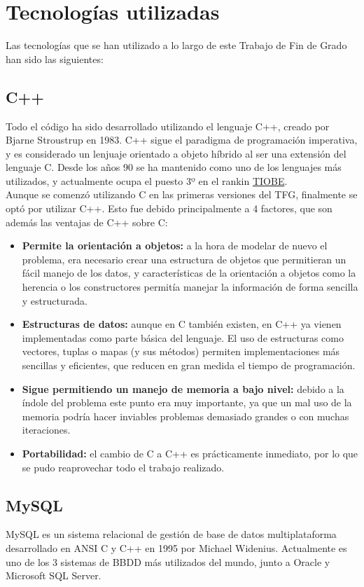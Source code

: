 \chapter{Tecnologías utilizadas}
\label{tecnologías}
Las tecnologías que se han utilizado a lo largo de este Trabajo de Fin de Grado han sido las siguientes:

\section{C++}
Todo el código ha sido desarrollado utilizando el lenguaje C++, creado por  Bjarne Stroustrup en 1983. C++ sigue el paradigma de programación imperativa, y es considerado un lenjuaje orientado a objeto híbrido al ser una extensión del lenguaje C. Desde los años 90 se ha mantenido como uno de los lenguajes más utilizados, y actualmente ocupa el puesto 3º en el rankin \href{http://www.tiobe.com/tiobe-index/}{TIOBE}.\\

Aunque se comenzó utilizando C en las primeras versiones del TFG, finalmente se optó por utilizar C++. Esto fue debido principalmente a 4 factores, que son además las ventajas de C++ sobre C:
\begin{itemize}
	\item \textbf{Permite la orientación a objetos: }a la hora de modelar de nuevo el problema, era necesario crear una estructura de objetos que permitieran un fácil manejo de los datos, y características de la orientación a objetos como la herencia o los constructores permitía manejar la información de forma sencilla y estructurada.
	\item \textbf{Estructuras de datos: }aunque en C también existen, en C++ ya vienen implementadas como parte básica del lenguaje. El uso de estructuras como vectores, tuplas o mapas (y sus métodos) permiten implementaciones más sencillas y eficientes, que reducen en gran medida el tiempo de programación.
	\item \textbf{Sigue permitiendo un manejo de memoria a bajo nivel: }debido a la índole del problema este punto era muy importante, ya que un mal uso de la memoria podría hacer inviables problemas demasiado grandes o con muchas iteraciones.
	\item \textbf{Portabilidad:} el cambio de C a C++ es prácticamente inmediato, por lo que se pudo reaprovechar todo el trabajo realizado.
\end{itemize}
                  

\section{MySQL}
MySQL es un sistema relacional de gestión de base de datos multiplataforma desarrollado en ANSI C y C++ en 1995 por Michael Widenius. Actualmente es uno de los 3 sistemas de BBDD más utilizados del mundo, junto a Oracle y Microsoft SQL Server.


